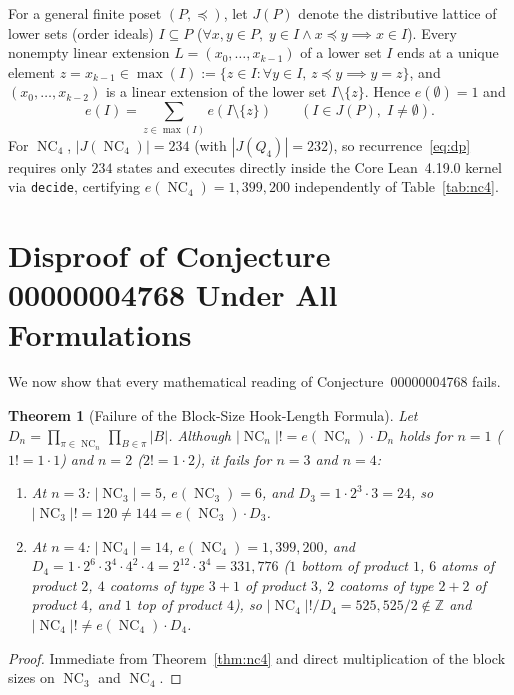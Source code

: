 \documentclass[11pt]{article}
\newtheorem{theorem}{Theorem}[section]
\theoremstyle{definition}
\newcommand{\NC}{\operatorname{NC}}
\begin{document}
For a general finite poset $(P, \preceq)$, let $J(P)$ denote the distributive lattice of
lower sets (order ideals) $I \subseteq P$ ($\forall x, y \in P,\; y \in I \land x \preceq
y \implies x \in I$). Every nonempty linear extension $L = (x_0, \dots, x_{k-1})$ of a
lower set $I$ ends at a unique element $z = x_{k-1} \in \max(I) := \{z \in I : \forall y
\in I,\, z \preceq y \implies y = z\}$, and $(x_0, \dots, x_{k-2})$ is a linear extension
of the lower set $I \setminus \{z\}$. Hence $e(\emptyset) = 1$ and
\begin{equation}\label{eq:dp}
  e(I) = \sum_{z \in \max(I)} e(I \setminus \{z\}) \qquad (I \in J(P),\; I \ne \emptyset).
\end{equation}
For $\NC_4$, $|J(\NC_4)| = 234$ (with $|J(Q_4)| = 232$), so recurrence~\eqref{eq:dp}
requires only $234$ states and executes directly inside the Core Lean~4.19.0 kernel via
\texttt{decide}, certifying $e(\NC_4) = 1{,}399{,}200$ independently of
Table~\ref{tab:nc4}.

\section{Disproof of Conjecture 00000004768 Under All Formulations}

We now show that every mathematical reading of Conjecture~00000004768 fails.

\begin{theorem}[Failure of the Block-Size Hook-Length Formula]\label{thm:blocksize}
Let $D_n = \prod_{\pi \in \NC_n} \prod_{B \in \pi} |B|$. Although $|\NC_n|! = e(\NC_n)
\cdot D_n$ holds for $n = 1$ ($1! = 1 \cdot 1$) and $n = 2$ ($2! = 1 \cdot 2$), it fails
for $n = 3$ and $n = 4$:
\begin{enumerate}
  \item At $n = 3$: $|\NC_3| = 5$, $e(\NC_3) = 6$, and $D_3 = 1 \cdot 2^3 \cdot 3 = 24$,
  so $|\NC_3|! = 120 \ne 144 = e(\NC_3) \cdot D_3$.
  \item At $n = 4$: $|\NC_4| = 14$, $e(\NC_4) = 1{,}399{,}200$, and $D_4 = 1 \cdot 2^6
  \cdot 3^4 \cdot 4^2 \cdot 4 = 2^{12} \cdot 3^4 = 331{,}776$ ($1$ bottom of product $1$,
  $6$ atoms of product $2$, $4$ coatoms of type $3+1$ of product $3$, $2$ coatoms of type
  $2+2$ of product $4$, and $1$ top of product $4$), so $|\NC_4|! / D_4 = 525{,}525 / 2
  \notin \mathbb{Z}$ and $|\NC_4|! \ne e(\NC_4) \cdot D_4$.
\end{enumerate}
\end{theorem}

\begin{proof}
Immediate from Theorem~\ref{thm:nc4} and direct multiplication of the block sizes on
$\NC_3$ and $\NC_4$.
\end{proof}
\end{document}
